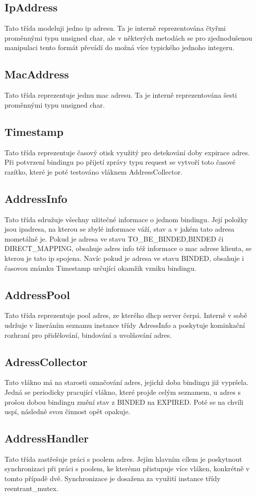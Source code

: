 \documentclass[12pt,a4paper]{report}
\begin{document}
\subsection*{IpAddress}
Tato třída modeluji jedno ip adresu. Ta je interně reprezentována čtyřmi proměnnými typu unsigned char, ale v některých metodách se pro zjednodušenou manipulaci tento formát převádí do možná více typického jednoho integeru.
\subsection*{MacAddress}
Tato třída reprezentuje jednu mac adresu. Ta je interně reprezentována šesti proměnnými typu unsigned char. 
\subsection*{Timestamp}
Tato třída reprezentuje časový otisk využitý pro detekování doby expirace adres. Při potvrzení bindingu po přijetí zprávy typu request se vytvoří toto časové razítko, které je poté testováno vláknem AddressCollector. 
\subsection*{AddressInfo}
Tato třída sdružuje všechny užitečné informace o jednom bindingu. Její položky jsou ipadresa, na kterou se zbylé informace váží, stav a v jakém tato adresa mometálně je. Pokud je adresa ve stavu TO\_BE\_BINDED,BINDED či DIRECT\_MAPPING, obsahuje adres info též informace o mac adrese klienta, se kterou je tato ip spojena. Navíc pokud je adresa ve stavu BINDED, obsahuje i časovou známku Timestamp určující okamžik vzniku bindingu.
\subsection*{AddressPool}
Tato třída reprezentuje pool adres, ze kterého dhcp server čerpá. Interně v sobě udržuje v lineráním seznamu instance třídy AdressInfo a poskytuje kominkační rozhraní pro přidělování, bindování a uvolňování adres.
\subsection*{AdressCollector}
Tato vlákno má na starosti označování adres, jejichž doba bindingu již vypršela. Jedná se periodicky pracující vlákno, které projde celým seznamem, u adres s prošou dobou bindingu změní stav z BINDED na EXPIRED. Poté se na chvíli uspí, následně svou činnost opět opakuje. 
\subsection*{AddressHandler}
Tato třída zastřešuje práci s poolem adres. Jejím hlavním cílem je poskytnout synchronizaci při práci s poolem, ke kterému přistupuje více vláken, konkrétně v tomto případě dvě. Synchronizace je dosažena za využití instance třídy reentrant\_mutex. 
\end{document}

